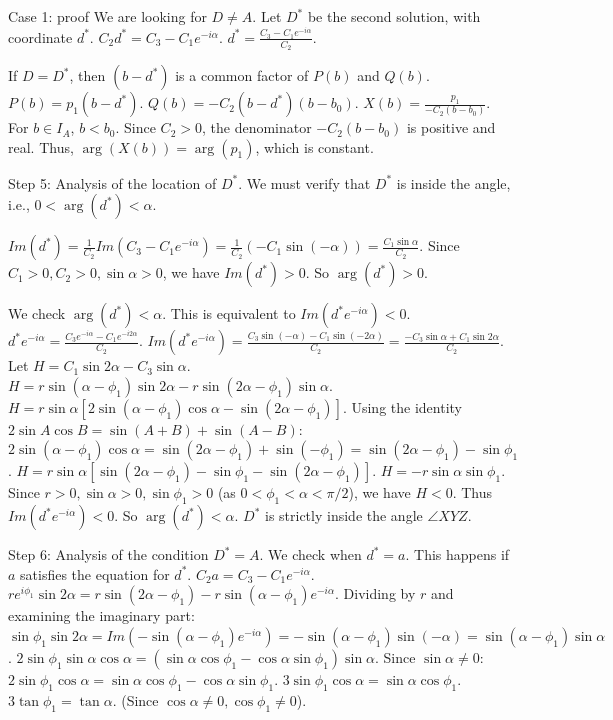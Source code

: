 \documentclass{article} %
\begin{document}
\begin{promptbox}{Case 1: proof}
We are looking for $D\ne A$. Let $D^*$ be the second solution, with coordinate $d^*$.
$C_2 d^* = C_3 - C_1 e^{-i\alpha}$.
$d^* = \frac{C_3 - C_1 e^{-i\alpha}}{C_2}$.

If $D=D^*$, then $(b-d^*)$ is a common factor of $P(b)$ and $Q(b)$.
$P(b)=p_1(b-d^*)$. $Q(b)=-C_2(b-d^*)(b-b_0)$.
$X(b) = \frac{p_1}{-C_2(b-b_0)}$.
For $b\in I_A$, $b<b_0$. Since $C_2>0$, the denominator $-C_2(b-b_0)$ is positive and real.
Thus, $\arg(X(b)) = \arg(p_1)$, which is constant.

Step 5: Analysis of the location of $D^*$.
We must verify that $D^*$ is inside the angle, i.e., $0 < \arg(d^*) < \alpha$.

$Im(d^*) = \frac{1}{C_2} Im(C_3 - C_1 e^{-i\alpha}) = \frac{1}{C_2} (-C_1 \sin(-\alpha)) = \frac{C_1\sin\alpha}{C_2}$.
Since $C_1>0, C_2>0, \sin\alpha>0$, we have $Im(d^*)>0$. So $\arg(d^*)>0$.

We check $\arg(d^*) < \alpha$. This is equivalent to $Im(d^* e^{-i\alpha}) < 0$.
$d^* e^{-i\alpha} = \frac{C_3 e^{-i\alpha} - C_1 e^{-i2\alpha}}{C_2}$.
$Im(d^* e^{-i\alpha}) = \frac{C_3 \sin(-\alpha) - C_1 \sin(-2\alpha)}{C_2} = \frac{-C_3\sin\alpha + C_1\sin 2\alpha}{C_2}$.
Let $H = C_1\sin 2\alpha - C_3\sin\alpha$.
$H = r\sin(\alpha-\phi_1)\sin 2\alpha - r\sin(2\alpha-\phi_1)\sin\alpha$.
$H = r\sin\alpha [2\sin(\alpha-\phi_1)\cos\alpha - \sin(2\alpha-\phi_1)]$.
Using the identity $2\sin A\cos B = \sin(A+B)+\sin(A-B)$:
$2\sin(\alpha-\phi_1)\cos\alpha = \sin(2\alpha-\phi_1) + \sin(-\phi_1) = \sin(2\alpha-\phi_1) - \sin\phi_1$.
$H = r\sin\alpha [\sin(2\alpha-\phi_1) - \sin\phi_1 - \sin(2\alpha-\phi_1)]$.
$H = -r\sin\alpha \sin\phi_1$.
Since $r>0, \sin\alpha>0, \sin\phi_1>0$ (as $0<\phi_1<\alpha<\pi/2$), we have $H<0$.
Thus $Im(d^* e^{-i\alpha}) < 0$. So $\arg(d^*) < \alpha$.
$D^*$ is strictly inside the angle $\angle XYZ$.

Step 6: Analysis of the condition $D^*=A$.
We check when $d^*=a$. This happens if $a$ satisfies the equation for $d^*$.
$C_2 a = C_3 - C_1 e^{-i\alpha}$.
$re^{i\phi_1}\sin 2\alpha = r\sin(2\alpha-\phi_1) - r\sin(\alpha-\phi_1)e^{-i\alpha}$.
Dividing by $r$ and examining the imaginary part:
$\sin\phi_1 \sin 2\alpha = Im(-\sin(\alpha-\phi_1)e^{-i\alpha}) = -\sin(\alpha-\phi_1)\sin(-\alpha) = \sin(\alpha-\phi_1)\sin\alpha$.
$2\sin\phi_1\sin\alpha\cos\alpha = (\sin\alpha\cos\phi_1-\cos\alpha\sin\phi_1)\sin\alpha$.
Since $\sin\alpha\ne 0$:
$2\sin\phi_1\cos\alpha = \sin\alpha\cos\phi_1-\cos\alpha\sin\phi_1$.
$3\sin\phi_1\cos\alpha = \sin\alpha\cos\phi_1$.
$3\tan\phi_1 = \tan\alpha$. (Since $\cos\alpha\ne 0, \cos\phi_1\ne 0$).


\end{promptbox}
\end{document}
